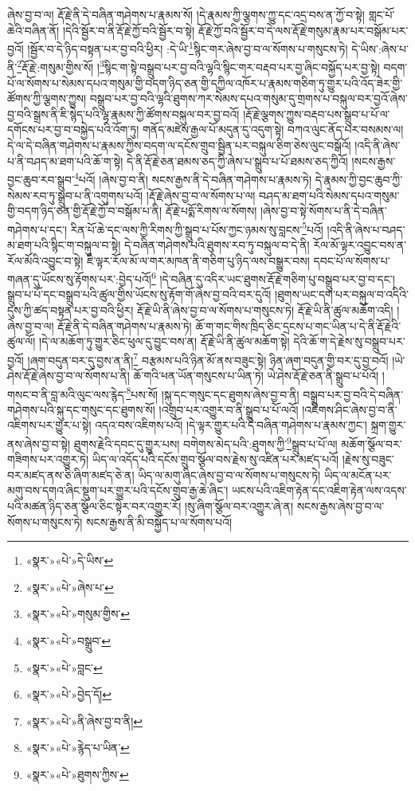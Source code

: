ཞེས་བྱ་བ་ལ། རྡོ་རྗེ་ནི་དེ་བཞིན་གཤེགས་པ་རྣམས་སོ། །དེ་རྣམས་ཀྱི་ལྕགས་ཀྱུ་དང་འདྲ་བས་ན་ཀྱོ་བ་སྟེ། གླང་པོ་ཆེའི་བཞིན་ནོ། །དེའི་སྦྱོར་བ་ནི་རྡོ་རྗེ་ཀྱོ་བའི་སྦྱོར་བ་སྟེ། རྡོ་རྗེ་ཀྱོ་བའི་སྦྱོར་བ་དེ་ལས་རྡོ་རྗེ་གསུམ་རྣམ་པར་བསྒོམ་པར་བྱའོ། །སྦྱོར་བ་དེ་ཉིད་བསྟན་པར་བྱ་བའི་ཕྱིར། :དེ་ཡི་\footnote{«སྣར་»«པེ་»དེ་ཡིས་}སྙིང་གར་ཞེས་བྱ་བ་ལ་སོགས་པ་གསུངས་ཏེ། དེ་ཡིས་:ཞེས་པ་ནི་\footnote{«སྣར་»«པེ་»ཞེས་པ་}རྡོ་རྗེ་:གསུམ་གྱིས་སོ། །\footnote{«སྣར་»«པེ་»གསུམ་གྱིས་}སྙིང་ག་སྟེ་བསྒྲུབ་པར་བྱ་བའི་ལྷའི་སྙིང་གར་བརྡབ་པར་བྱ་ཞིང་བསྐྱོད་པར་བྱ་སྟེ། བདག་པོ་ལ་སོགས་པ་སེམས་དཔའ་གསུམ་གྱི་བདག་ཉིད་ཅན་གྱི་དཀྱིལ་འཁོར་པ་རྣམས་གཅིག་ཏུ་གྱུར་པའི་འོད་ཟེར་གྱི་ཚོགས་ཀྱི་ལྕགས་ཀྱུས། བསྒྲུབ་པར་བྱ་བའི་ལྷའི་ཐུགས་ཀར་སེམས་དཔའ་གསུམ་དུ་གྲགས་པ་བསྐུལ་བར་བྱའོ་ཞེས་བྱ་བའི་སྒྲས་ནི་ཇི་སྙེད་པའི་ལྷ་རྣམས་ཀྱི་ཚོགས་བསྐུལ་བར་བྱ་བའོ། །རྡོ་རྗེ་ལྕགས་ཀྱུས་བརྡབ་པས་སྒྲུབ་པ་པོ་ལ་དགོངས་པར་བྱ་བ་བསྐྱེད་པའི་འོག་ཏུ། གནོད་མཛེས་རྒྱལ་པོ་མདུན་དུ་འདུག་སྟེ། བཀའ་ལུང་ནོད་པར་བསམས་ལ། དེ་ལ་དེ་བཞིན་གཤེགས་པ་རྣམས་ཀྱིས་བདག་ལ་དངོས་གྲུབ་སྦྱིན་པར་བསྐུལ་ཅིག་ཅེས་ལུང་བསྒོའོ། །འདི་ནི་ཞེས་པ་ནི་བཤད་མ་ཐག་པའི་ཆོ་ག་སྟེ། དེ་ནི་རྡོ་རྗེ་ཅན་ཐམས་ཅད་ཀྱི་ཞེས་པ་སྒྲུབ་པ་པོ་ཐམས་ཅད་ཀྱིའོ། །སངས་རྒྱས་བྱང་ཆུབ་རབ་སྒྲུབ་\footnote{«སྣར་»«པེ་»བསྒྲུབ་}པའོ། །ཞེས་བྱ་བ་ནི། སངས་རྒྱས་ནི་དེ་བཞིན་གཤེགས་པ་རྣམས་ཏེ། དེ་རྣམས་ཀྱི་བྱང་ཆུབ་ཀྱི་སེམས་རབ་ཏུ་སྒྲུབ་པ་ནི་འགུགས་པའོ། །རྡོ་རྗེ་ཞེས་བྱ་བ་ལ་སོགས་པ་ལ། བཤད་མ་ཐག་པའི་སེམས་དཔའ་གསུམ་གྱི་བདག་ཉིད་ཅན་གྱི་རྡོ་རྗེ་ཀྱོ་བ་བསྒོམ་པ་ནི། རྡོ་རྗེ་པདྨོ་རིགས་ལ་སོགས། །ཞེས་བྱ་བ་སྟེ་སོགས་པ་ནི་དེ་བཞིན་གཤེགས་པ་དང་། རིན་པོ་ཆེ་དང་ལས་ཀྱི་རིགས་ཀྱི་སྒྲུབ་པ་པོས་ཀྱང་ཉམས་སུ་བླངས་\footnote{«སྣར་»«པེ་»བླང་}པའོ། །འདི་ནི་ཞེས་པ་བཤད་མ་ཐག་པའི་སྙིང་ག་བསྐུལ་བ་སྟེ། དེ་བཞིན་གཤེགས་པའི་ཐུགས་རབ་ཏུ་བསྐུལ་བ་དེ་ནི། རོལ་མོ་ལྟར་འབྱུང་བས་ན་རོལ་མོའི་འབྱུང་བ་སྟེ། ཇི་ལྟར་རོལ་མོ་ལ་གར་མཁན་ནི་གཅིག་པུ་ཉིད་ལས་བསྒྱུར་བས། དབང་པོ་ལ་སོགས་པ་གཞན་དུ་ཡོངས་སུ་རྟོགས་པར་:བྱེད་པའོ།\footnote{«སྣར་»«པེ་»བྱེད་དོ།} །དེ་བཞིན་དུ་འདིར་ཡང་ཐུགས་རྡོ་རྗེ་གཅིག་པུ་བསྒྲུབ་པར་བྱ་བ་དང་། སྒྲུབ་པ་པོ་དང་བསྒྲུབ་པའི་ཚུལ་གྱིས་ཡོངས་སུ་རྟོག་གོ་ཞེས་བྱ་བའི་བར་དུའོ། །ཐུགས་ཡང་དག་པར་བསྐུལ་བ་འདིའི་དུས་ཀྱི་ཚད་བསྟན་པར་བྱ་བའི་ཕྱིར། རྡོ་རྗེ་ཡི་ནི་ཞེས་བྱ་བ་ལ་སོགས་པ་གསུངས་ཏེ། རྡོ་རྗེ་ཡི་ནི་ཚུལ་མཆོག་འདི། །ཞེས་བྱ་བ་ལ། རྡོ་རྗེ་ནི་དེ་བཞིན་གཤེགས་པ་རྣམས་ཏེ། ཆོ་ག་གང་གིས་ཁྲིད་ཅིང་དྲངས་པ་གང་ཡིན་པ་དེ་ནི་རྡོ་རྗེའི་ཚུལ་ལོ། །དེ་ལ་མཆོག་ཏུ་གྱུར་ཅིང་ཕུལ་དུ་བྱུང་བས་ན། རྡོ་རྗེ་ཡི་ནི་ཚུལ་མཆོག་སྟེ། དེའི་ཆོ་ག་དེ་རྗེས་སུ་བསྒྲུབ་པར་བྱའོ། །ཞག་བདུན་བར་དུ་བྱས་ན་ནི།\footnote{«སྣར་»«པེ་»ནི་ཞེས་བྱ་བ་ནི།} བརྩམས་པའི་ཉིན་མོ་ནས་བཟུང་སྟེ། ཉིན་ཞག་བདུན་གྱི་བར་དུ་བྱ་བའོ། །ཡེ་ཤེས་རྡོ་རྗེ་ཞེས་བྱ་བ་ལ་སོགས་པ་ནི། ཆོ་གའི་ཕན་ཡོན་གསུངས་པ་ཡིན་ཏེ། ཡེ་ཤེས་རྡོ་རྗེ་ཅན་ནི་སྒྲུབ་པ་པོའོ། །གསང་བ་ནི་བླ་མའི་ལུང་ལས་རྙེད་\footnote{«སྣར་»«པེ་»རྙེད་པ་ཡིན་}པས་སོ། །སྐུ་དང་གསུང་དང་ཐུགས་ཞེས་བྱ་བ་ནི། བསྒྲུབ་པར་བྱ་བའི་དེ་བཞིན་གཤེགས་པའི་སྐུ་དང་གསུང་དང་ཐུགས་སོ། །འགྲུབ་པར་འགྱུར་བ་ནི་སྒྲུབ་པ་པོ་ལའོ། །འཇིགས་ཤིང་ཞེས་བྱ་བ་ནི་འཇིགས་པར་གྱུར་པ་སྟེ། འདའ་བས་འཇིགས་པའོ། །དེ་ལྟར་གྱུར་པའི་དེ་བཞིན་གཤེགས་པ་རྣམས་ཀྱང་། སྐྲག་གྱུར་ནས་ཞེས་བྱ་བ་སྟེ། ཐུགས་རྗེའི་དབང་དུ་གྱུར་པས། བགེགས་མེད་པའི་:ཐུགས་ཀྱི་\footnote{«སྣར་»«པེ་»ཐུགས་ཀྱིས་}སྒྲུབ་པ་པོ་ལ། མཆོག་སྩོལ་བར་གཟིགས་པར་འགྱུར་ཏེ། ཡིད་ལ་འདོད་པའི་དངོས་གྲུབ་སྩོལ་བས་རྗེས་སུ་འཛིན་པར་མཛད་པའོ། །རྗེས་སུ་བཟུང་བར་མཛད་ནས་ཅི་ཞིག་མཛད་ཅེ་ན། ཡིད་ལ་མགུ་ཞིང་ཞེས་བྱ་བ་ལ་སོགས་པ་གསུངས་ཏེ། ཡིད་ལ་མངོན་པར་མགུ་བས་དགའ་ཞིང་སྡུག་པར་གྱུར་པའི་དངོས་གྲུབ་རྒྱ་ཆེ་ཞིང་། ཡངས་པའི་འཇིག་རྟེན་དང་འཇིག་རྟེན་ལས་འདས་པའི་མཚན་ཉིད་ཅན་སྩོལ་ཅིང་སྟེར་བར་འགྱུར་རོ། །སུ་ཞིག་སྩོལ་བར་འགྱུར་ཞེ་ན། སངས་རྒྱས་ཞེས་བྱ་བ་ལ་སོགས་པ་གསུངས་ཏེ། སངས་རྒྱས་ནི་མི་བསྐྱོད་པ་ལ་སོགས་པའོ། 
